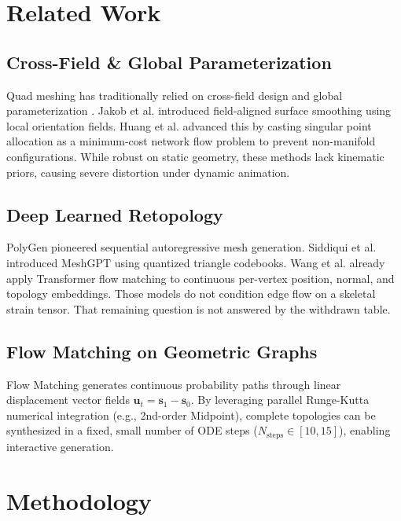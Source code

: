 \documentclass[acmtog,nonacm]{acmart}
\begin{document}
\section{Related Work}

\subsection{Cross-Field & Global Parameterization}
Quad meshing has traditionally relied on cross-field design and global parameterization \cite{bommes2009mixed}. Jakob et al. \cite{jakob2015instant} introduced field-aligned surface smoothing using local orientation fields. Huang et al. \cite{huang2018quadriflow} advanced this by casting singular point allocation as a minimum-cost network flow problem to prevent non-manifold configurations. While robust on static geometry, these methods lack kinematic priors, causing severe distortion under dynamic animation.

\subsection{Deep Learned Retopology}
PolyGen \cite{nash2020polygen} pioneered sequential autoregressive mesh generation. Siddiqui et al. \cite{siddiqui2024meshgpt} introduced MeshGPT using quantized triangle codebooks. Wang et al. \cite{wang2026polyflow} already apply Transformer flow matching to continuous per-vertex position, normal, and topology embeddings. Those models do not condition edge flow on a skeletal strain tensor. That remaining question is not answered by the withdrawn table.

\subsection{Flow Matching on Geometric Graphs}
Flow Matching \cite{lipman2023flow,albergo2023building} generates continuous probability paths through linear displacement vector fields $\mathbf{u}_t = \mathbf{s}_1 - \mathbf{s}_0$. By leveraging parallel Runge-Kutta numerical integration (e.g., 2nd-order Midpoint), complete topologies can be synthesized in a fixed, small number of ODE steps ($N_{\text{steps}} \in [10, 15]$), enabling interactive generation.

\section{Methodology}
\label{sec:method}
\end{document}
